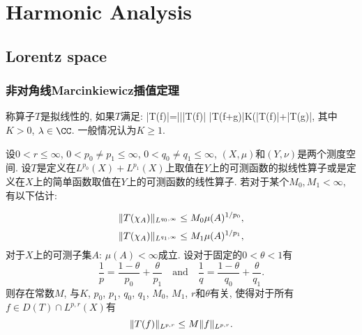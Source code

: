 \chapter{Harmonic Analysis}
\section{Lorentz space}
\subsection{非对角线Marcinkiewicz插值定理}
\bd{}{}
称算子$T$是拟线性的, 如果$T$满足:
\bee
\left|T(\lambda f)\right|=\left|\lambda\right|\cdot\left|T(f)\right|  \left|T(f+g)\right|\le K(\left|T(f)\right|+\left|T(g)\right|,
\eee
其中$K>0$, $\lambda\in \CC$. 一般情况认为$K\ge 1$.
\ed

\bt{}{}
设$0<r\le\infty$, $0<p_{0}\ne p_{1}\le\infty$, $0<q_{0}\ne q_{1}\le\infty$,
$\left(X,\mu\right)$和$\left(Y,\nu\right)$是两个测度空间. 设$T$是定义在$L^{p_{0}}(X)+L^{p_{1}}(X)$上取值在$Y$上的可测函数的拟线性算子或是定义在$X$上的简单函数取值在$Y$上的可测函数的线性算子.
若对于某个$M_{0},M_{1}<\infty$, 有以下估计:

\[
\lVert T(\chi_{A})\rVert_{L^{q_{0},\infty}}\le M_{0}\mu(A)^{1/p_{0}},
\]
\[
\lVert T(\chi_{A})\rVert_{L^{q_{1},\infty}}\le M_{1}\mu(A)^{1/p_{1}},
\]
对于$X$上的可测子集$A$: $\mu(A)<\infty$成立. 设对于固定的$0<\theta<1$有
\[
\frac{1}{p}=\frac{1-\theta}{p_{0}}+\frac{\theta}{p_{1}}\quad\text{and}\quad\frac{1}{q}=\frac{1-\theta}{q_{0}}+\frac{\theta}{q_{1}}.
\]
则存在常数$M$, 与$K$, $p_{0}$, $p_{1}$, $q_{0}$, $q_{1}$, $M_{0}$,
$M_{1}$, $r$和$\theta$有关, 使得对于所有$f\in D(T)\cap L^{p,r}(X)$有
\[
\lVert T(f)\rVert_{L^{p,r}}\le M\lVert f\rVert_{L^{p,r}}.
\]
\et